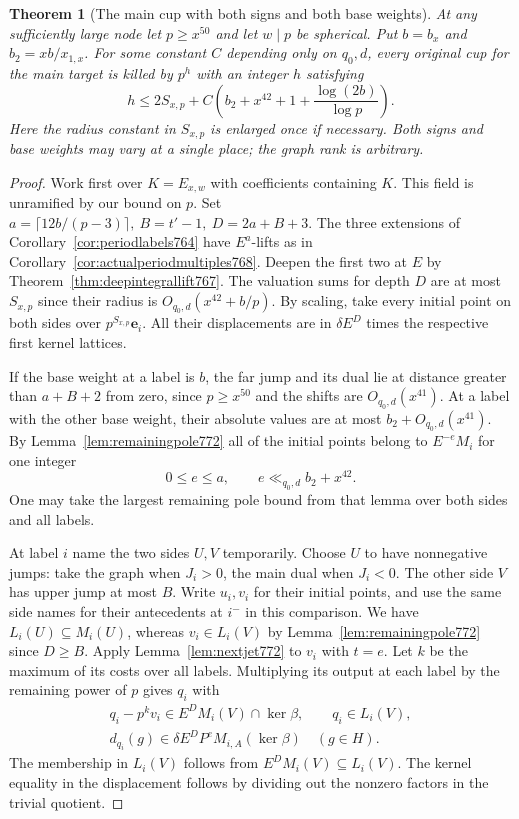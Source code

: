 \documentclass[a4paper,11pt]{article}
\newtheorem{theorem}[proposition]{Theorem}
\theoremstyle{definition}
\theoremstyle{remark}
\numberwithin{equation}{section}
\begin{document}
\begin{theorem}[The main cup with both signs and both base weights]
\leavevmode\label{thm:mixedcup772}
At any sufficiently large node let \(p\ge x^{50}\) and
let \(w\mid p\) be spherical. Put \(b=b_x\) and
\(b_2=xb/x_{1,x}\). For some constant \(C\) depending
only on \(q_0,d\), every original cup for the main target
is killed by \(p^h\) with an integer \(h\) satisfying
\[
 h\le 2S_{x,p}
     +C\left(b_2+x^{42}+1+\frac{\log(2b)}{\log p}\right).
\]
Here the radius constant in \(S_{x,p}\) is enlarged once
if necessary. Both signs and base weights may vary at a
single place; the graph rank is arbitrary.
\end{theorem}
\begin{proof}
Work first over \(K=E_{x,w}\) with coefficients containing
\(K\). This field is unramified by our bound on \(p\).
Set \(a=\lceil12b/(p-3)\rceil,\ B=t'-1,\ D=2a+B+3\).
The three extensions of Corollary~\ref{cor:periodlabels764}
have \(E^a\)-lifts as in Corollary~\ref{cor:actualperiodmultiples768}.
Deepen the first two at \(E\) by
Theorem~\ref{thm:deepintegrallift767}. The valuation sums
for depth \(D\) are at most \(S_{x,p}\) since their radius
is \(O_{q_0,d}(x^{42}+b/p)\). By scaling, take every
initial point on both sides over \(p^{S_{x,p}}\mathbf e_i\).
All their displacements are in \(\delta E^D\) times the
respective first kernel lattices.

If the base weight at a label is \(b\), the far jump and
its dual lie at distance greater than \(a+B+2\) from zero,
since \(p\ge x^{50}\) and the shifts are \(O_{q_0,d}(x^{41})\).
At a label with the other base weight, their absolute
values are at most \(b_2+O_{q_0,d}(x^{41})\). By
Lemma~\ref{lem:remainingpole772} all of the initial points
belong to \(E^{-e}M_i\) for one integer
\[
       0\le e\le a,\qquad e\ll_{q_0,d} b_2+x^{42}.
\]
One may take the largest remaining pole bound from that
lemma over both sides and all labels.

At label \(i\) name the two sides \(U,V\) temporarily.
Choose \(U\) to have nonnegative jumps: take the graph
when \(J_i>0\), the main dual when \(J_i<0\). The other
side \(V\) has upper jump at most \(B\). Write \(u_i,v_i\)
for their initial points, and use the same side names for
their antecedents at \(i^-\) in this comparison.
We have \(L_i(U)\subseteq M_i(U)\), whereas \(v_i\in L_i(V)\)
by Lemma~\ref{lem:remainingpole772} since \(D\ge B\).
Apply Lemma~\ref{lem:nextjet772} to \(v_i\) with \(t=e\).
Let \(k\) be the maximum of its costs over all labels.
Multiplying its output at each label by the remaining
power of \(p\) gives \(q_i\) with
\[
 \begin{gathered}
 q_i-p^k v_i\in E^D M_i(V)\cap\ker\beta,\qquad
 q_i\in L_i(V),\\
 d_{q_i}(g)\in\delta E^D P^e M_{i,A}(\ker\beta)
                                      \quad(g\in H).
 \end{gathered}
\]
The membership in \(L_i(V)\) follows from
\(E^D M_i(V)\subseteq L_i(V)\). The kernel equality in
the displacement follows by dividing out the nonzero
factors in the trivial quotient.


\end{proof}
\end{document}
